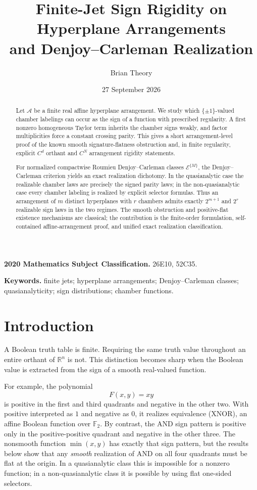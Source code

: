 \documentclass[11pt]{article}
\title{\vspace{-1.2cm}\textbf{Finite-Jet Sign Rigidity on Hyperplane Arrangements\\and Denjoy--Carleman Realization}}
\author{Brian Theory}
\date{27 September 2026}
\theoremstyle{definition}
\theoremstyle{remark}
\newcommand{\R}{\mathbb{R}}
\newcommand{\Ftwo}{\mathbb{F}_2}
\begin{document}
\maketitle

\begin{abstract}
Let $\mathcal A$ be a finite real affine hyperplane arrangement. We study which $\{\pm1\}$-valued chamber labelings can occur as the sign of a function with prescribed regularity. A first nonzero homogeneous Taylor term inherits the chamber signs weakly, and factor multiplicities force a constant crossing parity. This gives a short arrangement-level proof of the known smooth signature-flatness obstruction and, in finite regularity, explicit $C^d$ orthant and $C^N$ arrangement rigidity statements.

For normalized compactwise Roumieu Denjoy--Carleman classes $\mathcal E^{\{M\}}$, the Denjoy--Carleman criterion yields an exact realization dichotomy. In the quasianalytic case the realizable chamber laws are precisely the signed parity laws; in the non-quasianalytic case every chamber labeling is realized by explicit selector formulas. Thus an arrangement of $m$ distinct hyperplanes with $r$ chambers admits exactly $2^{m+1}$ and $2^r$ realizable sign laws in the two regimes. The smooth obstruction and positive-flat existence mechanisms are classical; the contribution is the finite-order formulation, self-contained affine-arrangement proof, and unified exact realization classification.
\end{abstract}

\noindent\textbf{2020 Mathematics Subject Classification.} 26E10, 52C35.

\noindent\textbf{Keywords.} finite jets; hyperplane arrangements; Denjoy--Carleman classes; quasianalyticity; sign distributions; chamber functions.

\section{Introduction}

A Boolean truth table is finite. Requiring the same truth value throughout an entire orthant of $\R^n$ is not. This distinction becomes sharp when the Boolean value is extracted from the sign of a smooth real-valued function.

For example, the polynomial
\[
F(x,y)=xy
\]
is positive in the first and third quadrants and negative in the other two. With positive interpreted as $1$ and negative as $0$, it realizes equivalence (XNOR), an affine Boolean function over $\Ftwo$. By contrast, the AND sign pattern is positive only in the positive-positive quadrant and negative in the other three. The nonsmooth function $\min(x,y)$ has exactly that sign pattern, but the results below show that any \emph{smooth} realization of AND on all four quadrants must be flat at the origin. In a quasianalytic class this is impossible for a nonzero function; in a non-quasianalytic class it is possible by using flat one-sided selectors.
\end{document}
